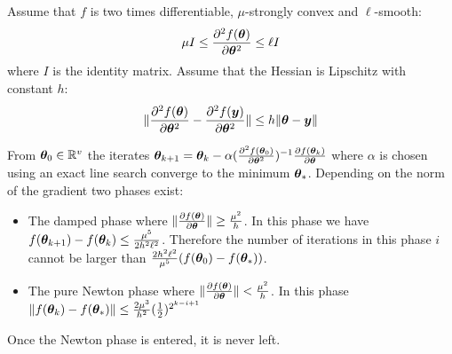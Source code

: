 \begin{prop}
  \label{eq:conv:newton}
  Assume that $f$ is two times differentiable, $\mu$-strongly convex and $\ell$-smooth:
  \begin{equation}
    \mu I \leq \partialfrac{\thetab^2}{^2 f(\thetab)} \leq \ell I
  \end{equation}
  where $I$ is the identity matrix.
  Assume that the Hessian is Lipschitz with constant $h$:
  \begin{equation}
  \| \partialfrac{\thetab^2}{^2 f(\thetab)} - \partialfrac{\thetab^2}{^2 f(\yb)} \| \leq h \| \thetab
  - \yb \|
 \end{equation}

  From $\thetab_0 \in \RR^v$  the iterates
  $\thetab_{k+1} = \thetab_k -\alpha (\partialfrac{\thetab^2}{^2 f(\thetab_0)})^{-1}
  \partialfrac{\thetab}{f(\thetab_k)}$ where $\alpha$ is chosen using an exact line
  search converge to the
  minimum $\thetab_*$.
  Depending on the norm of the gradient two phases exist:
  \begin{itemize}
  \item The damped phase where $\| \partialfrac{\thetab}{f(\thetab)} \| \geq \frac{\mu^2}{h}$.
    In this phase we have $f(\thetab_{k+1}) - f(\thetab_k) \leq \frac{\mu^5}{2h^2 \ell^2}$.
    Therefore the number of iterations in this phase $i$ cannot be larger than
    $\frac{2 h^2 \ell^2}{\mu^5}(f(\thetab_0) - f(\thetab_*))$.
  \item The pure Newton phase where $\| \partialfrac{\thetab}{f(\thetab)} \| < \frac{\mu^2}{h}$.
      In this phase $\|f(\thetab_{k}) - f(\thetab_*)\| \leq \frac{2 \mu^3}{h^2}
      (\frac12)^{2^{k -i +1}}$
 \end{itemize}
 Once the Newton phase is entered, it is never left.
\end{prop}
